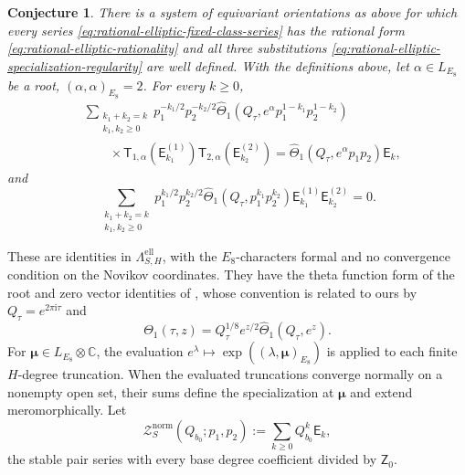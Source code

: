\documentclass{amsart}
\newtheorem{conjecture}{Conjecture}
\theoremstyle{definition}
\numberwithin{equation}{section}
\newcommand{\C}{\mathbb C}
\begin{document}
\begin{conjecture}
\label{conj:rational-elliptic-theta}
There is a system of equivariant orientations as above for which every series \eqref{eq:rational-elliptic-fixed-class-series} has the rational form \eqref{eq:rational-elliptic-rationality} and all three substitutions \eqref{eq:rational-elliptic-specialization-regularity} are well defined.  With the definitions above, let \(\alpha\in L_{E_8}\) be a root, \((\alpha,\alpha)_{E_8}=2\).  For every \(k\geq0\),
\begin{equation}
\begin{aligned}
 &\sum_{\substack{k_1+k_2=k\\k_1,k_2\geq0}}
 p_1^{-k_1/2}p_2^{-k_2/2}
 \widehat\Theta_1\left(
 Q_\tau,e^\alpha p_1^{1-k_1}p_2^{1-k_2}\right)\\
 &\qquad\times
 \mathsf T_{1,\alpha}(\mathsf E_{k_1}^{(1)})
 \mathsf T_{2,\alpha}(\mathsf E_{k_2}^{(2)})
 =\widehat\Theta_1(Q_\tau,e^\alpha p_1p_2)
 \mathsf E_k,
\end{aligned}
\label{eq:rational-elliptic-unity}
\end{equation}
and
\begin{equation}
 \sum_{\substack{k_1+k_2=k\\k_1,k_2\geq0}}
 p_1^{k_1/2}p_2^{k_2/2}
 \widehat\Theta_1\left(
 Q_\tau,p_1^{k_1}p_2^{k_2}\right)
 \mathsf E_{k_1}^{(1)}\mathsf E_{k_2}^{(2)}=0.
\label{eq:rational-elliptic-vanishing}
\end{equation}
\end{conjecture}

These are identities in \(\Lambda_{S,H}^{\mathrm{ell}}\), with the \(E_8\)-characters formal and no convergence condition on the Novikov coordinates.  They have the theta function form of the root and zero vector identities of \cite[Section~3]{GuHaghighatKlemmSunWang}, whose convention is related to ours by \(Q_\tau=e^{2\pi\mathrm{i}\tau}\) and
\[
 \Theta_1(\tau,z)
 =Q_\tau^{1/8}e^{z/2}
  \widehat\Theta_1(Q_\tau,e^z).
\]
For \(\boldsymbol\mu\in L_{E_8}\otimes\C\), the evaluation \(e^\lambda\mapsto\exp((\lambda,\boldsymbol\mu)_{E_8})\) is applied to each finite \(H\)-degree truncation.  When the evaluated truncations converge normally on a nonempty open set, their sums define the specialization at \(\boldsymbol\mu\) and extend meromorphically.  Let
\begin{equation}
 \mathcal Z_S^{\mathrm{norm}}(Q_{b_0};p_1,p_2)
 :=\sum_{k\geq0}Q_{b_0}^k
 \mathsf E_k,
\label{eq:rational-elliptic-total-series}
\end{equation}
the stable pair series with every base degree coefficient divided by \(\mathsf Z_0\).
\end{document}
